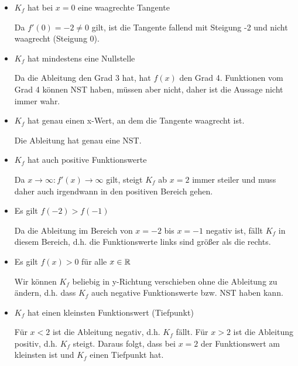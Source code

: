 \begin{Answer}[ref=ableitungInterpretationA1]

	\begin{itemize}
		\item[$\square$] \(K_f\) hat bei \(x=0\) eine waagrechte Tangente

		Da \(f'(0)=-2\neq 0\) gilt, ist die Tangente fallend mit Steigung -2 und nicht waagrecht (Steigung 0).
		\item[$\square$] \(K_f\) hat mindestens eine Nullstelle

		Da die Ableitung den Grad 3 hat, hat \(f(x)\) den Grad 4. Funktionen vom Grad 4 können NST haben, müssen aber nicht, daher ist die Aussage nicht immer wahr.
		\item[$\checkmark$] \(K_f\) hat genau einen x-Wert, an dem die Tangente waagrecht ist.

		Die Ableitung hat genau eine NST.
		\item[$\checkmark$] \(K_f\) hat auch positive Funktionswerte

		Da \(x\to\infty\colon f'(x)\to\infty\) gilt, steigt \(K_f\) ab \(x=2\) immer steiler und muss daher auch irgendwann in den positiven Bereich gehen.
		\item[$\checkmark$] Es gilt \(f(-2)>f(-1)\)

		Da die Ableitung im Bereich von \(x=-2\) bis \(x=-1\) negativ ist, fällt \(K_f\) in diesem Bereich, d.h. die Funktionswerte links sind größer als die rechts.
		\item[$\square$] Es gilt \(f(x)>0\) für alle \(x\in\mathbb{R}\)

		Wir können \(K_f\) beliebig in y-Richtung verschieben ohne die Ableitung zu ändern, d.h. dass \(K_f\) auch negative Funktionswerte bzw. NST haben kann.
		\item[$\checkmark$] \(K_f\) hat einen kleinsten Funktionswert (Tiefpunkt)

		Für \(x<2\) ist die Ableitung negativ, d.h. \(K_f\) fällt. Für \(x>2\) ist die Ableitung positiv, d.h. \(K_f\) steigt. Daraus folgt, dass bei \(x=2\) der Funktionswert am kleinsten ist und \(K_f\) einen Tiefpunkt hat.
	\end{itemize}
\end{Answer}